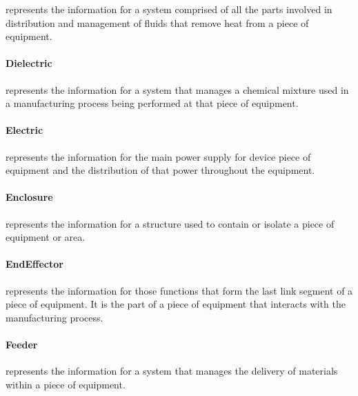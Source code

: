  represents the information for a system comprised of all the parts involved in distribution and management of fluids that remove heat from a piece of equipment.


\paragraph{Dielectric}\mbox{}
\label{sec:Dielectric}



 represents the information for a system that manages a chemical mixture used in a manufacturing process being performed at that piece of equipment.


\paragraph{Electric}\mbox{}
\label{sec:Electric}



 represents the information for the main power supply for device piece of equipment and the distribution of that power throughout the equipment.


\paragraph{Enclosure}\mbox{}
\label{sec:Enclosure}



 represents the information for a structure used to contain or isolate a piece of equipment or area.


\paragraph{EndEffector}\mbox{}
\label{sec:EndEffector}



 represents the information for those functions that form the last link segment of a piece of equipment. It is the part of a piece of equipment that interacts with the manufacturing process.


\paragraph{Feeder}\mbox{}
\label{sec:Feeder}



 represents the information for a system that manages the delivery of materials within a piece of equipment.


